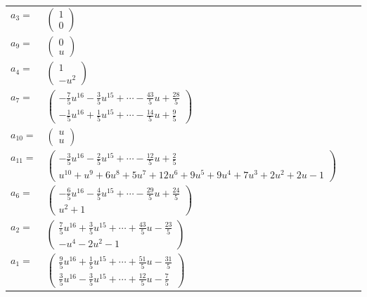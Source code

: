 \documentclass[1p]{elsarticle_modified}
\theoremstyle{definition}
\begin{document}
\begin{tabular}{m{7pt} m{180pt} m{7pt} m{180pt} }
\flushright $a_{3}=$&$\begin{pmatrix}1\\0\end{pmatrix}$ \\
\flushright $a_{9}=$&$\begin{pmatrix}0\\u\end{pmatrix}$ \\
\flushright $a_{4}=$&$\begin{pmatrix}1\\- u^2\end{pmatrix}$ \\
\flushright $a_{7}=$&$\begin{pmatrix}-\frac{7}{5} u^{16}-\frac{3}{5} u^{15}+\cdots-\frac{43}{5} u+\frac{28}{5}\\-\frac{1}{5} u^{16}+\frac{1}{5} u^{15}+\cdots-\frac{14}{5} u+\frac{9}{5}\end{pmatrix}$ \\
\flushright $a_{10}=$&$\begin{pmatrix}u\\u\end{pmatrix}$ \\
\flushright $a_{11}=$&$\begin{pmatrix}-\frac{3}{5} u^{16}-\frac{2}{5} u^{15}+\cdots-\frac{12}{5} u+\frac{2}{5}\\u^{10}+u^9+6 u^8+5 u^7+12 u^6+9 u^5+9 u^4+7 u^3+2 u^2+2 u-1\end{pmatrix}$ \\
\flushright $a_{6}=$&$\begin{pmatrix}-\frac{6}{5} u^{16}-\frac{4}{5} u^{15}+\cdots-\frac{29}{5} u+\frac{24}{5}\\u^2+1\end{pmatrix}$ \\
\flushright $a_{2}=$&$\begin{pmatrix}\frac{7}{5} u^{16}+\frac{3}{5} u^{15}+\cdots+\frac{43}{5} u-\frac{23}{5}\\- u^4-2 u^2-1\end{pmatrix}$ \\
\flushright $a_{1}=$&$\begin{pmatrix}\frac{9}{5} u^{16}+\frac{1}{5} u^{15}+\cdots+\frac{51}{5} u-\frac{31}{5}\\\frac{3}{5} u^{16}-\frac{3}{5} u^{15}+\cdots+\frac{12}{5} u-\frac{7}{5}\end{pmatrix}$ \\

\end{tabular}
\end{document}
